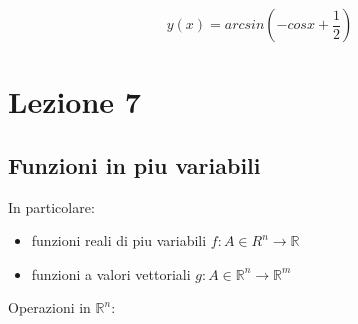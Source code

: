 \documentclass[11pt]{article}
\begin{document}
\[
    y(x) = arcsin(-cosx +\frac{1}{2})
\]
   
\newpage

\section{Lezione 7}

\subsection{Funzioni in piu variabili}

In particolare:

\begin{itemize}
    \item funzioni reali di piu variabili $f: A \in R^{n} \rightarrow \mathbb{R}$
    \item funzioni a valori vettoriali $g: A \in \mathbb{R}^{n}\rightarrow \mathbb{R}^{m}$
\end{itemize}




Operazioni in $\mathbb{R}^{n}$:
\end{document}
